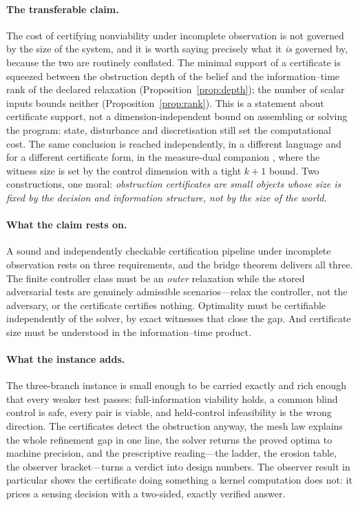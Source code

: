 \documentclass[11pt,a4paper]{article}
\theoremstyle{plain}
\theoremstyle{definition}
\theoremstyle{remark}
\begin{document}
\paragraph{The transferable claim.}
The cost of certifying nonviability under incomplete observation is not governed by the size of the system, and it is worth saying precisely what it \emph{is} governed by, because the two are routinely conflated. The minimal support of a certificate is squeezed between the obstruction depth of the belief and the information--time rank of the declared relaxation (Proposition~\ref{prop:depth}); the number of scalar inputs bounds neither (Proposition~\ref{prop:rank}). This is a statement about certificate support, not a dimension-independent bound on assembling or solving the program: state, disturbance and discretisation still set the computational cost. The same conclusion is reached independently, in a different language and for a different certificate form, in the measure-dual companion \cite{Abaee2026minimax}, where the witness size is set by the control dimension with a tight $k+1$ bound. Two constructions, one moral: \emph{obstruction certificates are small objects whose size is fixed by the decision and information structure, not by the size of the world.}

\paragraph{What the claim rests on.}
A sound and independently checkable certification pipeline under incomplete observation rests on three requirements, and the bridge theorem delivers all three. The finite controller class must be an \emph{outer} relaxation while the stored adversarial tests are genuinely admissible scenarios---relax the controller, not the adversary, or the certificate certifies nothing. Optimality must be certifiable independently of the solver, by exact witnesses that close the gap. And certificate size must be understood in the information--time product.

\paragraph{What the instance adds.}
The three-branch instance is small enough to be carried exactly and rich enough that every weaker test passes: full-information viability holds, a common blind control is safe, every pair is viable, and held-control infeasibility is the wrong direction. The certificates detect the obstruction anyway, the mesh law explains the whole refinement gap in one line, the solver returns the proved optima to machine precision, and the prescriptive reading---the ladder, the erosion table, the observer bracket---turns a verdict into design numbers. The observer result in particular shows the certificate doing something a kernel computation does not: it prices a sensing decision with a two-sided, exactly verified answer.
\end{document}
